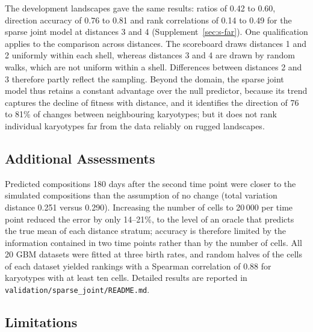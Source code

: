 \documentclass[11pt]{article}
\begin{document}
The development landscapes gave the same results: ratios of 0.42 to 0.60,
direction accuracy of 0.76 to 0.81 and rank correlations of 0.14 to 0.49 for
the sparse joint model at distances 3 and 4 (Supplement~\ref{sec:s-far}). One qualification applies to the
comparison across distances. The scoreboard draws distances 1 and 2
uniformly within each shell, whereas distances 3 and 4 are drawn by random
walks, which are not uniform within a shell. Differences between distances 2
and 3 therefore partly reflect the sampling. Beyond the domain, the sparse joint model thus
retains a constant advantage over the null predictor, because its trend
captures the decline of fitness with distance, and it identifies the
direction of 76 to 81\% of changes between neighbouring karyotypes; but
it does not rank individual karyotypes far from the data reliably on rugged
landscapes.

\subsection{Additional Assessments}
\label{sec:val-additional}

Predicted compositions 180 days after the second time point were closer to the
simulated compositions than the assumption of no change (total variation
distance 0.251 versus 0.290). Increasing the number of cells to 20\,000 per
time point reduced the error by only 14--21\%, to the level of an oracle that
predicts the true mean of each distance stratum; accuracy is therefore limited
by the information contained in two time points rather than by the number of cells.
All 20 GBM datasets were fitted at three birth rates, and random halves of
the cells of each dataset yielded rankings with a Spearman correlation of 0.88 for
karyotypes with at least ten cells. Detailed results are reported in
\texttt{validation/sparse\_joint/README.md}.

\subsection{Limitations}
\label{sec:val-limitations}
\end{document}

